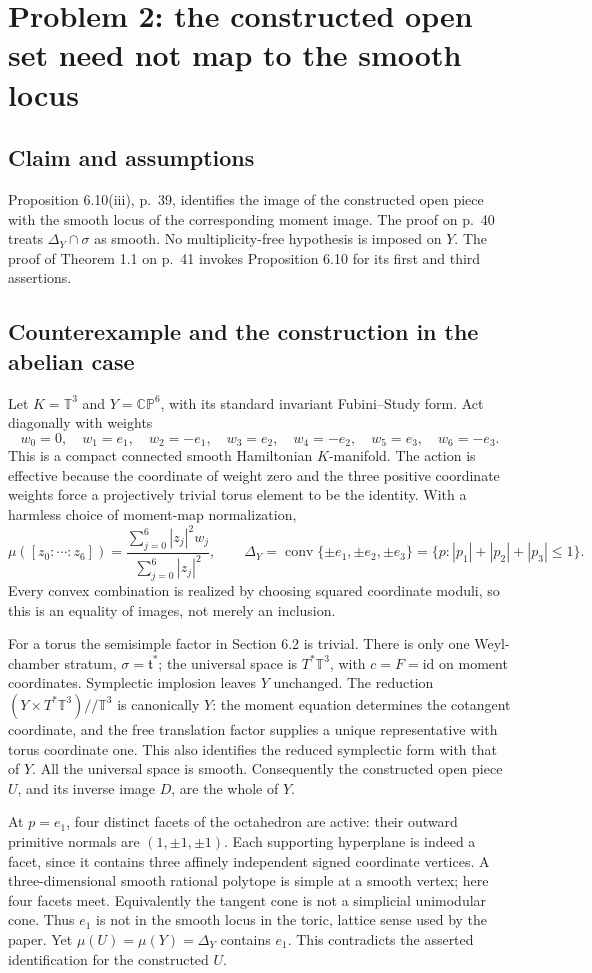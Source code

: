 \documentclass[10pt]{article}
\begin{document}
\section*{Problem 2: the constructed open set need not map to the smooth locus}
\subsection*{Claim and assumptions}
Proposition 6.10(iii), p. 39, identifies the image of the constructed open piece with the smooth locus of the corresponding moment image. The proof on p. 40 treats \(\Delta_Y\cap\sigma\) as smooth. No multiplicity-free hypothesis is imposed on \(Y\). The proof of Theorem 1.1 on p. 41 invokes Proposition 6.10 for its first and third assertions.\par
\subsection*{Counterexample and the construction in the abelian case}
Let \(K=\mathbb T^3\) and \(Y=\mathbb {CP}^6\), with its standard invariant Fubini–Study form. Act diagonally with weights \[w_0=0,\quad w_1=e_1,\quad w_2=-e_1,\quad
 w_3=e_2,\quad w_4=-e_2,\quad w_5=e_3,\quad w_6=-e_3 .\] This is a compact connected smooth Hamiltonian \(K\)-manifold. The action is effective because the coordinate of weight zero and the three positive coordinate weights force a projectively trivial torus element to be the identity. With a harmless choice of moment-map normalization, \[\mu([z_0:\cdots:z_6])
   =\frac{\sum_{j=0}^6 |z_j|^2w_j}{\sum_{j=0}^6|z_j|^2},
 \qquad
 \Delta_Y=\mathop{\mathrm{conv}}\{\pm e_1,\pm e_2,\pm e_3\}
          =\{p:|p_1|+|p_2|+|p_3|\leq1\}.\] Every convex combination is realized by choosing squared coordinate moduli, so this is an equality of images, not merely an inclusion.\par
For a torus the semisimple factor in Section 6.2 is trivial. There is only one Weyl-chamber stratum, \(\sigma=\mathfrak t^*\); the universal space is \(T^*\mathbb T^3\), with \(c=F=\mathrm{id}\) on moment coordinates. Symplectic implosion leaves \(Y\) unchanged. The reduction \((Y\times T^*\mathbb T^3)//\mathbb T^3\) is canonically \(Y\): the moment equation determines the cotangent coordinate, and the free translation factor supplies a unique representative with torus coordinate one. This also identifies the reduced symplectic form with that of \(Y\). All the universal space is smooth. Consequently the constructed open piece \(U\), and its inverse image \(D\), are the whole of \(Y\).\par
At \(p=e_1\), four distinct facets of the octahedron are active: their outward primitive normals are \((1,\pm1,\pm1)\). Each supporting hyperplane is indeed a facet, since it contains three affinely independent signed coordinate vertices. A three-dimensional smooth rational polytope is simple at a smooth vertex; here four facets meet. Equivalently the tangent cone is not a simplicial unimodular cone. Thus \(e_1\) is not in the smooth locus in the toric, lattice sense used by the paper. Yet \(\mu(U)=\mu(Y)=\Delta_Y\) contains \(e_1\). This contradicts the asserted identification for the constructed \(U\).\par
\end{document}
